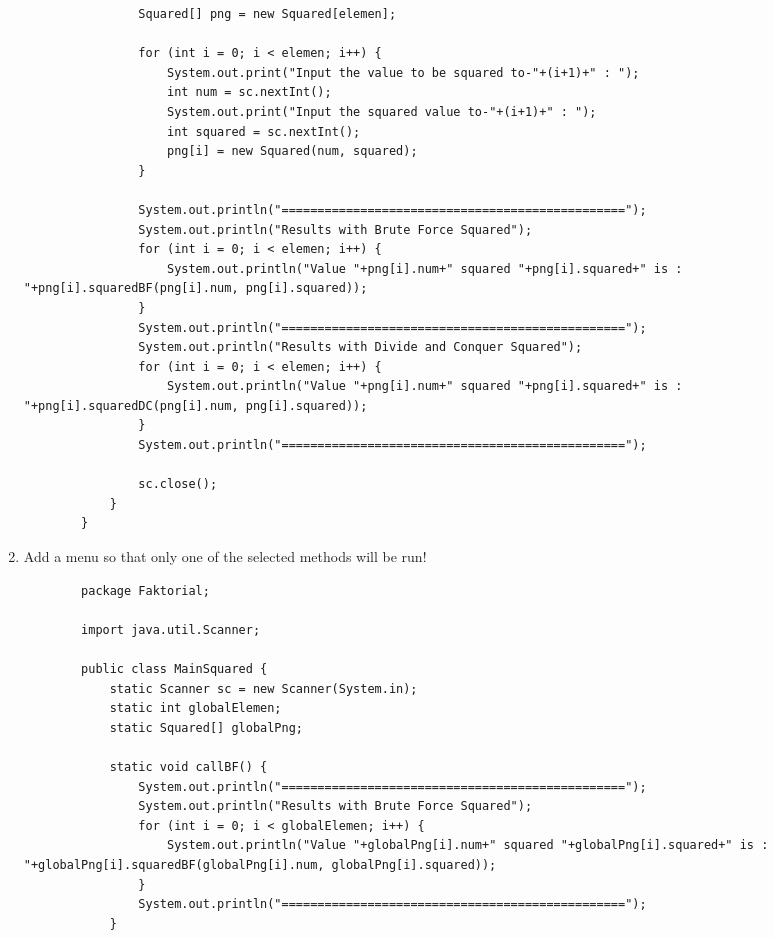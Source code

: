 \documentclass[12pt,titlepage]{article}
\begin{document}
\begin{enumerate}
\begin{verbatim}
                Squared[] png = new Squared[elemen];
                
                for (int i = 0; i < elemen; i++) {
                    System.out.print("Input the value to be squared to-"+(i+1)+" : ");
                    int num = sc.nextInt();
                    System.out.print("Input the squared value to-"+(i+1)+" : ");
                    int squared = sc.nextInt();
                    png[i] = new Squared(num, squared);
                }

                System.out.println("================================================");
                System.out.println("Results with Brute Force Squared");
                for (int i = 0; i < elemen; i++) {
                    System.out.println("Value "+png[i].num+" squared "+png[i].squared+" is : "+png[i].squaredBF(png[i].num, png[i].squared));
                }
                System.out.println("================================================");
                System.out.println("Results with Divide and Conquer Squared");
                for (int i = 0; i < elemen; i++) {
                    System.out.println("Value "+png[i].num+" squared "+png[i].squared+" is : "+png[i].squaredDC(png[i].num, png[i].squared));
                }
                System.out.println("================================================");

                sc.close();
            }
        }
    \end{verbatim}
    \item Add a menu so that only one of the selected methods will be run!
    \begin{verbatim}
        package Faktorial;

        import java.util.Scanner;

        public class MainSquared {
            static Scanner sc = new Scanner(System.in);
            static int globalElemen;
            static Squared[] globalPng;

            static void callBF() {
                System.out.println("================================================");
                System.out.println("Results with Brute Force Squared");
                for (int i = 0; i < globalElemen; i++) {
                    System.out.println("Value "+globalPng[i].num+" squared "+globalPng[i].squared+" is : "+globalPng[i].squaredBF(globalPng[i].num, globalPng[i].squared));
                }
                System.out.println("================================================");
            }


\end{verbatim}
\end{enumerate}
\end{document}
